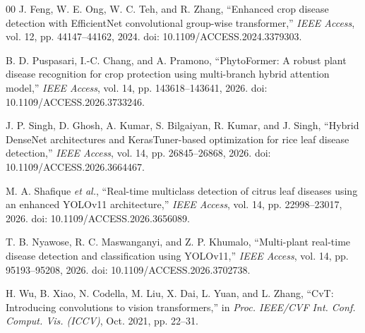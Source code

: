 \documentclass[conference]{IEEEtran}
\begin{document}
\begin{thebibliography}{00}
J. Feng, W. E. Ong, W. C. Teh, and R. Zhang, ``Enhanced crop disease detection with EfficientNet convolutional group-wise transformer,'' \textit{IEEE Access}, vol. 12, pp. 44147--44162, 2024. doi: 10.1109/ACCESS.2024.3379303.

B. D. Puspasari, I.-C. Chang, and A. Pramono, ``PhytoFormer: A robust plant disease recognition for crop protection using multi-branch hybrid attention model,'' \textit{IEEE Access}, vol. 14, pp. 143618--143641, 2026. doi: 10.1109/ACCESS.2026.3733246.

J. P. Singh, D. Ghosh, A. Kumar, S. Bilgaiyan, R. Kumar, and J. Singh, ``Hybrid DenseNet architectures and KerasTuner-based optimization for rice leaf disease detection,'' \textit{IEEE Access}, vol. 14, pp. 26845--26868, 2026. doi: 10.1109/ACCESS.2026.3664467.

M. A. Shafique \textit{et al.}, ``Real-time multiclass detection of citrus leaf diseases using an enhanced YOLOv11 architecture,'' \textit{IEEE Access}, vol. 14, pp. 22998--23017, 2026. doi: 10.1109/ACCESS.2026.3656089.

T. B. Nyawose, R. C. Maswanganyi, and Z. P. Khumalo, ``Multi-plant real-time disease detection and classification using YOLOv11,'' \textit{IEEE Access}, vol. 14, pp. 95193--95208, 2026. doi: 10.1109/ACCESS.2026.3702738.

H. Wu, B. Xiao, N. Codella, M. Liu, X. Dai, L. Yuan, and L. Zhang, ``CvT: Introducing convolutions to vision transformers,'' in \textit{Proc. IEEE/CVF Int. Conf. Comput. Vis. (ICCV)}, Oct. 2021, pp. 22--31.
\end{thebibliography}
\end{document}
